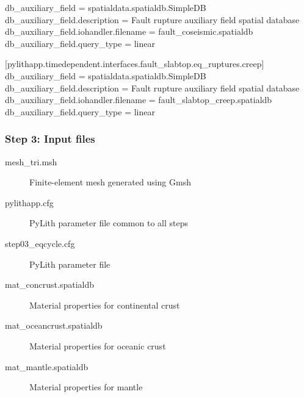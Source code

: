 \documentclass[aspectratio=169]{beamer}
\begin{document}
\begin{frame}[t,fragile]
\begin{minipage}[t]{0.67\textwidth}
\begin{onlyenv}
\begin{cfgcode}
        db_auxiliary_field = spatialdata.spatialdb.SimpleDB
        db_auxiliary_field.description = Fault rupture auxiliary field spatial database
        db_auxiliary_field.iohandler.filename = fault_coseismic.spatialdb
        db_auxiliary_field.query_type = linear

        [pylithapp.timedependent.interfaces.fault_slabtop.eq_ruptures.creep]
        db_auxiliary_field = spatialdata.spatialdb.SimpleDB
        db_auxiliary_field.description = Fault rupture auxiliary field spatial database
        db_auxiliary_field.iohandler.filename = fault_slabtop_creep.spatialdb
        db_auxiliary_field.query_type = linear
      \end{cfgcode}
    \end{onlyenv}
  \end{minipage}

  
\end{frame}


\begin{frame}
  \frametitle{Step 3: Input files}
  \summary{}

  \begin{description}
  \item[mesh\_tri.msh] Finite-element mesh generated using Gmsh
  \item[pylithapp.cfg] PyLith parameter file common to all steps
  \item[step03\_eqcycle.cfg] PyLith parameter file
  \item[mat\_concrust.spatialdb] Material properties for continental crust
  \item[mat\_oceancrust.spatialdb] Material properties for oceanic crust
  \item[mat\_mantle.spatialdb] Material properties for mantle
  \end{description}
    
\end{frame}
\end{document}
